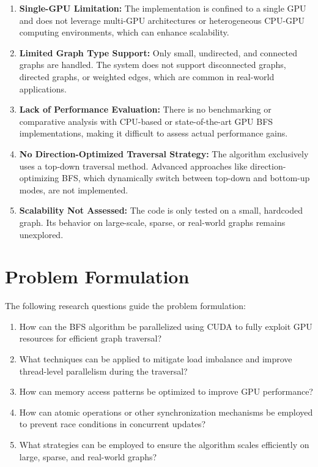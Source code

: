 \documentclass[a4paper,12pt]{article}
\begin{document}
\begin{center}
\begin{enumerate}
    \item \textbf{Single-GPU Limitation:} The implementation is confined to a single GPU and does not leverage multi-GPU architectures or heterogeneous CPU-GPU computing environments, which can enhance scalability.

    \item \textbf{Limited Graph Type Support:} Only small, undirected, and connected graphs are handled. The system does not support disconnected graphs, directed graphs, or weighted edges, which are common in real-world applications.

    \item \textbf{Lack of Performance Evaluation:} There is no benchmarking or comparative analysis with CPU-based or state-of-the-art GPU BFS implementations, making it difficult to assess actual performance gains.

    \item \textbf{No Direction-Optimized Traversal Strategy:} The algorithm exclusively uses a top-down traversal method. Advanced approaches like direction-optimizing BFS, which dynamically switch between top-down and bottom-up modes, are not implemented.

    \item \textbf{Scalability Not Assessed:} The code is only tested on a small, hardcoded graph. Its behavior on large-scale, sparse, or real-world graphs remains unexplored.
\end{enumerate}
\newpage
\section*{Problem Formulation}


The following research questions guide the problem formulation:
\begin{enumerate}
    \item How can the BFS algorithm be parallelized using CUDA to fully exploit GPU resources for efficient graph traversal?
    \item What techniques can be applied to mitigate load imbalance and improve thread-level parallelism during the traversal?
    \item How can memory access patterns be optimized to improve GPU performance?
    \item How can atomic operations or other synchronization mechanisms be employed to prevent race conditions in concurrent updates?
    \item What strategies can be employed to ensure the algorithm scales efficiently on large, sparse, and real-world graphs?
\end{enumerate}
\newpage

\end{center}
\end{document}
